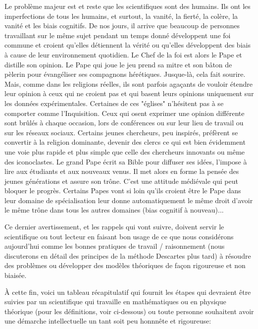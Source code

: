 	Le problème majeur est et reste que les scientifiques sont des humains. Ils ont les imperfections de tous les humains, et surtout, la vanit\'e, la fiert\'e, la colère, la vanit\'e et les biais cognitifs. De nos jours, il arrive que beaucoup de personnes travaillant sur le même sujet pendant un temps donn\'e d\'eveloppent une foi commune et croient qu'elles d\'etiennent la v\'erit\'e ou qu'elles d\'eveloppent des biais à cause de leur environnement quotidien. Le Chef de la foi est alors le Pape et distille son opinion. Le Pape qui joue le jeu prend sa mitre et son bâton de pèlerin pour \'evang\'eliser ses compagnons h\'er\'etiques. Jusque-là, cela fait sourire. Mais, comme dans les religions r\'eelles, ils sont parfois agaçants de vouloir \'etendre leur opinion à ceux qui ne croient pas et qui basent leurs opinions uniquement sur les donn\'ees exp\'erimentales. Certaines de ces "\'eglises" n'h\'esitent pas à se comporter comme l'Inquisition. Ceux qui osent exprimer une opinion diff\'erente sont brûl\'es à chaque occasion, lors de conf\'erences ou sur leur lieu de travail ou sur les r\'eseaux sociaux. Certains jeunes chercheurs, peu inspir\'es, pr\'efèrent se convertir à la religion dominante, devenir des clercs ce qui est bien \'evidemment une voie plus rapide et plus simple que celle des chercheurs innovants ou même des iconoclastes. Le grand Pape \'ecrit sa Bible pour diffuser ses id\'ees, l'impose à lire aux \'etudiants et aux nouveaux venus. Il met alors en forme la pens\'ee des jeunes g\'en\'erations et assure son trône. C'est une attitude m\'edi\'evale qui peut bloquer le progrès. Certains Papes vont si loin qu'ils croient être le Pape dans leur domaine de sp\'ecialisation leur donne automatiquement le même droit d'avoir le même trône dans tous les autres domaines (bias cognitif à nouveau)...
	

	Ce dernier avertissement, et les rappels qui vont suivre, doivent servir le scientifique ou tout lecteur en faisant bon usage de ce que nous consid\'erons aujourd'hui comme les bonnes pratiques de travail / raisonnement (nous discuterons en d\'etail des principes de la m\'ethode Descartes plus tard) à r\'esoudre des problèmes ou d\'evelopper des modèles th\'eoriques de façon rigoureuse et non biais\'ee. 

	À cette fin, voici un tableau r\'ecapitulatif qui fournit les \'etapes qui devraient être suivies par un scientifique qui travaille en math\'ematiques ou en physique th\'eorique (pour les d\'efinitions, voir ci-dessous) ou toute personne souhaitent avoir une d\'emarche intellectuelle un tant soit peu honnnête et rigoureuse:

